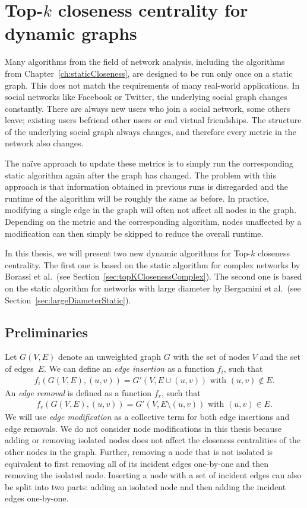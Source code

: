 \chapter{Top-$k$ closeness centrality for dynamic graphs}
\label{ch:dynamicCloseness}

Many algorithms from the field of network analysis, including the algorithms from Chapter~\ref{ch:staticCloseness}, are designed to be run only once on a static graph. This does not match the requirements of many real-world applications. In social networks like Facebook or Twitter, the underlying social graph changes constantly. There are always new users who join a social network, some others leave; existing users befriend other users or end virtual friendships. The structure of the underlying social graph always changes, and therefore every metric in the network also changes.

The na\"ive approach to update these metrics is to simply run the corresponding static algorithm again after the graph has changed. The problem with this approach is that information obtained in previous runs is disregarded and the runtime of the algorithm will be roughly the same as before. In practice, modifying a single edge in the graph will often not affect all nodes in the graph. Depending on the metric and the corresponding algorithm, nodes unaffected by a modification can then simply be skipped to reduce the overall runtime.

In this thesis, we will present two new dynamic algorithms for Top-$k$ closeness centrality. The first one is based on the static algorithm for complex networks by Borassi et al.\ (see Section~\ref{sec:topKClosenessComplex}). The second one is based on the static algorithm for networks with large diameter by Bergamini et al.\ (see Section~\ref{sec:largeDiameterStatic}).

\section{Preliminaries}
Let $G(V, E)$ denote an unweighted graph $G$ with the set of nodes $V$ and the set of edges~$E$. We can define an \emph{edge insertion} as a function $f_i$, such that
\begin{align}
	f_i(G(V, E), (u, v)) = G'(V, E \cup (u, v))\text{ with } (u, v) \notin E.
\end{align}
An \emph{edge removal} is defined as a function $f_r$, such that
\begin{align}
	f_r(G(V, E), (u, v)) = G'(V, E \setminus (u, v)) \text{ with } (u, v) \in E.
\end{align}
We will use \emph{edge modification} as a collective term for both edge insertions and edge removals. We do not consider node modifications in this thesis because adding or removing isolated nodes does not affect the closeness centralities of the other nodes in the graph. Further, removing a node that is not isolated is equivalent to first removing all of its incident edges one-by-one and then removing the isolated node. Inserting a node with a set of incident edges can also be split into two parts: adding an isolated node and then adding the incident edges one-by-one.

